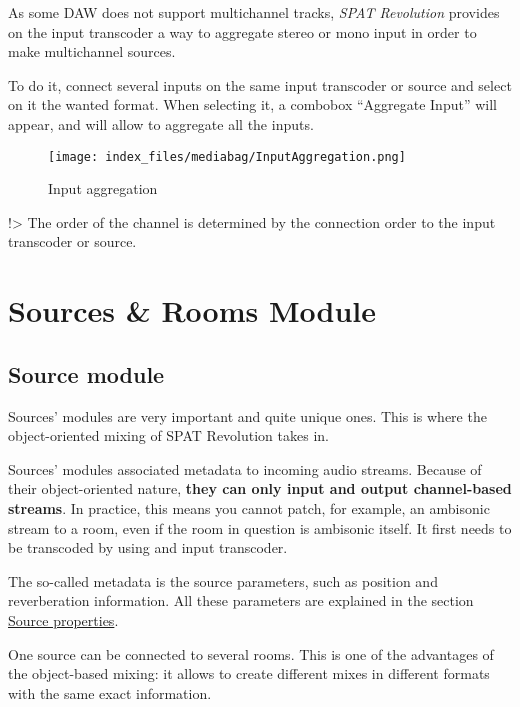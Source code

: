 \documentclass[
  letterpaper,
  DIV=11,
  numbers=noendperiod]{scrreport}
\begin{document}
As some DAW does not support multichannel tracks, \emph{SPAT Revolution}
provides on the input transcoder a way to aggregate stereo or mono input
in order to make multichannel sources.

To do it, connect several inputs on the same input transcoder or source
and select on it the wanted format. When selecting it, a combobox
``Aggregate Input'' will appear, and will allow to aggregate all the
inputs.

\begin{figure}

{\centering \texttt{[image: index\_files/mediabag/InputAggregation.png]}

}

\caption{Input aggregation}

\end{figure}

!\textgreater{} The order of the channel is determined by the connection
order to the input transcoder or source.

\hypertarget{sources-rooms-module}{%
\chapter{Sources \& Rooms Module}\label{sources-rooms-module}}

\hypertarget{source-module}{%
\section{Source module}\label{source-module}}

Sources' modules are very important and quite unique ones. This is where
the object-oriented mixing of SPAT Revolution takes in.

Sources' modules associated metadata to incoming audio streams. Because
of their object-oriented nature, \textbf{they can only input and output
channel-based streams}. In practice, this means you cannot patch, for
example, an ambisonic stream to a room, even if the room in question is
ambisonic itself. It first needs to be transcoded by using and input
transcoder.

The so-called metadata is the source parameters, such as position and
reverberation information. All these parameters are explained in the
section \href{Spat_Environment_Source.md}{Source properties}.

One source can be connected to several rooms. This is one of the
advantages of the object-based mixing: it allows to create different
mixes in different formats with the same exact information.
\end{document}
